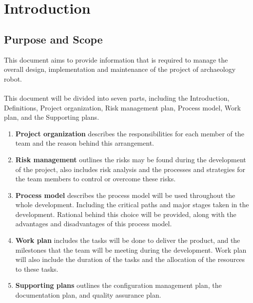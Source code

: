 \documentclass[11pt, a4paper]{report}
\begin{document}

\chapter{Introduction}

\section{Purpose and Scope}
This document aims to provide information that is required to manage the overall design, implementation and maintenance of the project of archaeology robot. \\ \\
This document will be divided into seven parts, including the Introduction, Definitions, Project organization, Risk management plan, Process model, Work plan, and the Supporting plans.

\begin{enumerate}
	\item \textbf{Project organization} describes the responsibilities for each member of the team and the reason behind this arrangement.
	\item \textbf{Risk management} outlines the risks may be found during the development of the project, also includes risk analysis and the processes and strategies for the team members to control or overcome these risks.
	\item \textbf{Process model} describes the process model will be used throughout the whole development. Including the critical paths and major stages taken in the development. Rational behind this choice will be provided, along with the advantages and disadvantages of this process model. 
	\item \textbf{Work plan} includes the tasks will be done to deliver the product, and the milestones that the team will be meeting during the development. Work plan will also include the duration of the tasks and the allocation of the resources to these tasks.
	\item \textbf{Supporting plans} outlines the configuration management plan, the documentation plan, and quality assurance plan.
\end{enumerate}
\end{document}
